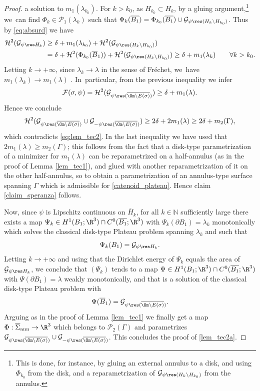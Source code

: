 \begin{proof}
a solution to $m_1(\lambda_{k_0})$.
For $k> k_0$, as $H_{k_0}\subset H_k$, by a
gluing argument,\footnote{This is done, for instance, by gluing an external annulus to a disk, and using $\Phi_{k_0}$ from the disk, and a reparametrization of $\mathcal G_{\psi\res(H_k\setminus H_{k_0})}$ from the annulus.} we~can find $\Phi_k\in\mathcal{P}_1(\lambda_k)$ such that $\Phi_k(\overline{B_1})=\Phi_{k_0}(\overline{B_1})\cup \mathcal G_{\psi\res(H_k\setminus H_{k_0})}$. Thus by \eqref{eq:absurd} we have
\[
\begin{aligned}
\mathcal H^2( \mathcal G_{\psi\res H_{k}})
&\geq
\delta + m_1(\lambda_{k_0})
+
\mathcal H^2( \mathcal G_{\psi\res (H_k\setminus H_{k_0})})
\\
&=
\delta + \mathcal H^2(\Phi_{k_0}(\overline B_1))
+
\mathcal H^2( \mathcal G_{\psi\res (H_k\setminus H_{k_0})})
\geq
\delta+ m_1(\lambda_k)
\qquad \forall k> k_0.
\end{aligned}
\]
Letting $k\to +\infty$, since $\lambda_k\to\lambda$ in the sense of Fréchet, we~have $m_1(\lambda_k)\to m_1(\lambda)$ \cite[Th.\,4, \S 4.3]{DHS}.
In~particular, from the previous inequality we infer
\begin{equation*}
\mathcal{F}(\sigma,\psi)=\mathcal{H}^2(\mathcal G_{\psi\res(\overline{\Om\setminus E(\sigma)})})\ge\delta+m_1(\lambda).
\end{equation*}
Hence we conclude
\[
\mathcal{H}^2(\mathcal G_{\psi\res(\overline{\Om\setminus E(\sigma)})}\cup \mathcal G_{-\psi\res(\overline{\Om\setminus E(\sigma)})})\geq 2\delta+2m_1(\lambda)\geq 2\delta+m_2(\Gamma),
\]
which contradicts \eqref{eq:lem_tec2}.
In the last inequality we have used that $2m_1(\lambda)\geq m_2(\Gamma)$; this follows from the fact that a disk-type parametrization of a minimizer for $m_1(\lambda)$ can be reparametrized on a half-annulus (as in the proof of Lemma \ref{lem_tec1}), and glued with another reparametrization of it on the other half-annulus, so to obtain a parametrization of an annulus-type surface spanning $\Gamma$ which is admissible for \eqref{catenoid_plateau}.
Hence claim \eqref{claim_speranza} follows.

Now, since $\psi$ is Lipschitz continuous on $\overline H_k$, for
all $k\in \mathbb N$ sufficiently large there exists a
map $\Psi_k\in H^1(B_1;\R^3)\cap C^0(\overline {B_1};\R^3)$ with $\Psi_{k}(\partial B_1)=\lambda_{k}$ monotonically which solves the classical disk-type
Plateau problem {spanning} $\lambda_k$ and such that
\[
\Psi_k(B_1)=\mathcal G_{\psi\res H_k}.
\]
Letting $k\to +\infty$
and using that the Dirichlet energy of $\Psi_k$ equals the area of $\mathcal G_{\psi\res H_k}$, we
conclude that $(\Psi_k)$ tends to a map $\Psi\in H^1(B_1;\R^3)\cap C^0(\overline {B_1};\R^3)$
with $\Psi(\partial B_1)=\lambda$ {weakly} monotonically, and that is a solution of the classical disk-type Plateau problem with
\[
\Psi(\overline B_1)=\mathcal{G}_{\psi\res(\overline{\Om\setminus E(\sigma)})}.
\]
Arguing as in the proof of Lemma \ref{lem_tec1} we
finally get a map $\Phi:
\overline\Sigma_\mathrm{ann}\to \R^3$ which belongs to $\mathcal P_2(\Gamma)$ and parametrizes $\mathcal{G}_{\psi\res(\overline{\Om\setminus E(\sigma)})}\cup \mathcal{G}_{-\psi\res(\overline{\Om\setminus E(\sigma)})}$.
This concludes the proof of \ref{lem_tec2a}.


\end{proof}
